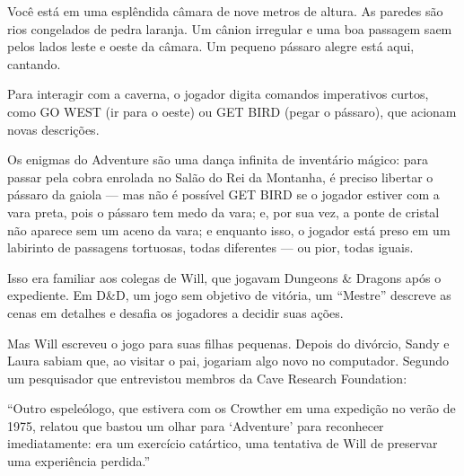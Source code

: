 \documentclass[12pt,a4paper]{article}
\begin{document}
Você está em uma esplêndida câmara de nove metros de altura.
As paredes são rios congelados de pedra laranja.
Um cânion irregular e uma boa passagem saem pelos lados leste e oeste da câmara.
Um pequeno pássaro alegre está aqui, cantando.

Para interagir com a caverna, o jogador digita comandos imperativos curtos, como
GO WEST (ir para o oeste) ou GET BIRD (pegar o pássaro),
que acionam novas descrições.

Os enigmas do Adventure são uma dança infinita de inventário mágico:
para passar pela cobra enrolada no Salão do Rei da Montanha, é preciso libertar o pássaro da gaiola —
mas não é possível GET BIRD se o jogador estiver com a vara preta, pois o pássaro tem medo da vara;
e, por sua vez, a ponte de cristal não aparece sem um aceno da vara;
e enquanto isso, o jogador está preso em um labirinto de passagens tortuosas,
todas diferentes — ou pior, todas iguais.

Isso era familiar aos colegas de Will, que jogavam Dungeons & Dragons após o expediente.
Em D&D, um jogo sem objetivo de vitória, um “Mestre” descreve as cenas em detalhes e desafia os jogadores a decidir suas ações.

Mas Will escreveu o jogo para suas filhas pequenas.
Depois do divórcio, Sandy e Laura sabiam que, ao visitar o pai, jogariam algo novo no computador.
Segundo um pesquisador que entrevistou membros da Cave Research Foundation:

“Outro espeleólogo, que estivera com os Crowther em uma expedição no verão de 1975, relatou que bastou um olhar para ‘Adventure’ para reconhecer imediatamente:
era um exercício catártico, uma tentativa de Will de preservar uma experiência perdida.”

\printbibliography
\end{document}
